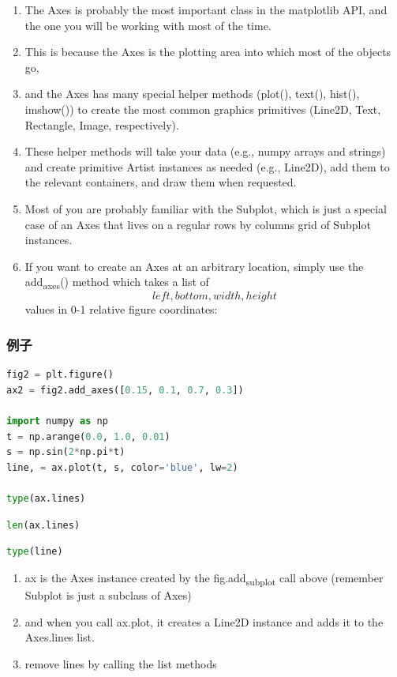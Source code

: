 \documentclass[UTF8,a4paper,12pt]{ctexart}  %
\providecommand{\tightlist}{\setlength{\itemsep}{0pt}\setlength{\parskip}{0pt}}
\begin{document}
\begin{enumerate}
\def\labelenumi{\arabic{enumi}.}
\tightlist
\item
  The Axes is probably the most important class in the matplotlib API,
  and the one you will be working with most of the time.
\item
  This is because the Axes is the plotting area into which most of the
  objects go,
\item
  and the Axes has many special helper methods (plot(), text(),
  hist(), imshow()) to create the most common graphics primitives
  (Line2D, Text, Rectangle, Image, respectively).
\item
  These helper methods will take your data (e.g., numpy arrays and
  strings) and create primitive Artist instances as needed (e.g.,
  Line2D), add them to the relevant containers, and draw them when
  requested.
\item
  Most of you are probably familiar with the Subplot, which is just a
  special case of an Axes that lives on a regular rows by columns grid
  of Subplot instances.
\item
  If you want to create an Axes at an arbitrary location, simply use
  the add\textsubscript{axes}() method which takes a list of \[left, bottom, width,
  height\] values in 0-1 relative figure coordinates:
\end{enumerate}

\hypertarget{ux4f8bux5b50-3}{%
\subsubsection{例子}\label{ux4f8bux5b50-3}}

\begin{lstlisting}[language=Python]
fig2 = plt.figure()
ax2 = fig2.add_axes([0.15, 0.1, 0.7, 0.3])

import numpy as np
t = np.arange(0.0, 1.0, 0.01)
s = np.sin(2*np.pi*t)
line, = ax.plot(t, s, color='blue', lw=2)

type(ax.lines)
\end{lstlisting}

\begin{lstlisting}[language=Python]
len(ax.lines)
\end{lstlisting}

\begin{lstlisting}[language=Python]
type(line)
\end{lstlisting}

\begin{enumerate}
\def\labelenumi{\arabic{enumi}.}
\tightlist
\item
  ax is the Axes instance created by the fig.add\textsubscript{subplot} call above
  (remember Subplot is just a subclass of Axes)
\item
  and when you call ax.plot, it creates a Line2D instance and adds it
  to the Axes.lines list.
\item
  remove lines by calling the list methods
\end{enumerate}
\end{document}
